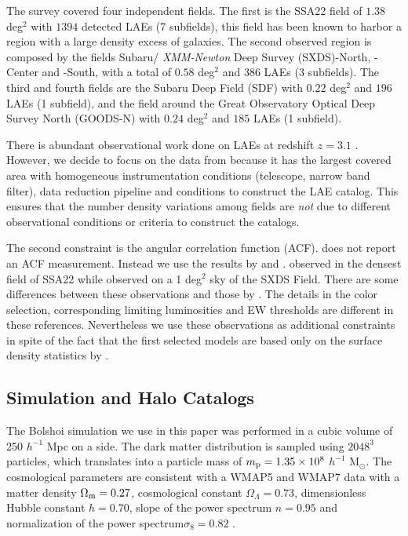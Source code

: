 \documentclass[usenatbib]{mn2e}
\begin{document}
The survey covered four independent fields. The first is the SSA22
field of $1.38$ deg$^2$ with $1394$ detected LAEs (7 subfields), this field has been
known to harbor a region with a large density excess of galaxies. The
second observed region is composed by the fields Subaru/{\it
  XMM-Newton} Deep Survey (SXDS)-North, -Center and -South, with a 
total of $0.58$ deg$^2$ and $386$ LAEs (3 subfields). The third and fourth fields
are the Subaru Deep Field (SDF) with $0.22$ deg$^2$ and $196$ LAEs (1 subfield),
and the field around the Great Observatory Optical Deep Survey North
(GOODS-N) with $0.24$ deg$^2$ and $185$ LAEs (1 subfield). 

There is abundant observational work done on LAEs at redshift $z=3.1$
\citep{Kudritzki2000,Matsuda2005,Gawiser2007,Nilsson2007,Ouchi2008}.
However, we decide to focus on the data from \cite{Yamada2012} because
it has the largest covered area with homogeneous instrumentation
conditions (telescope, narrow band filter), data reduction pipeline
and conditions to construct the LAE catalog. This ensures that the
number density variations among fields are \emph{not} due to different
observational conditions or criteria to construct the catalogs.

The second constraint is the angular correlation function
(ACF). \cite{Yamada2012} does not report an ACF measurement. Instead
we use the results by \cite{Hayashino2004} and
\cite{Ouchi2008,Ouchi2010}. \cite{Hayashino2004} observed in the
densest field of SSA22 while \cite{Ouchi2008} observed on a 1 deg$^2$
sky of the SXDS Field.  There are some differences between these
observations and those by \cite{Yamada2012}. The details in the color
selection, corresponding limiting luminosities and EW thresholds are
different in these references. Nevertheless we use these observations
as additional constraints in spite of the fact that the first selected
models are based only on the surface density statistics by
\citep{Yamada2012}.  





\subsection{Simulation and Halo Catalogs}

The Bolshoi simulation \citep{Bolshoi} we use in this paper was
performed in a cubic volume of 250 $h^{-1}$ Mpc on a side. The
dark matter distribution is sampled using $2048^{3}$ particles, which
translates into a particle mass of $m_{\rm   p}=1.35\times 10^{8}$
$h^{-1}$ M$_{\odot}$.  The cosmological parameters are consistent with
a WMAP5 and WMAP7 data with a matter density $\Omega_{\rm m} = 0.27$,
cosmological constant $\Omega_{\Lambda}=0.73$, dimensionless Hubble constant
$h=0.70$, slope of the power spectrum $n=0.95$ and normalization of the
power spectrum$\sigma_{8}=0.82$ \citep{Komatsu2009,Jarosik2011}.  
\end{document}
